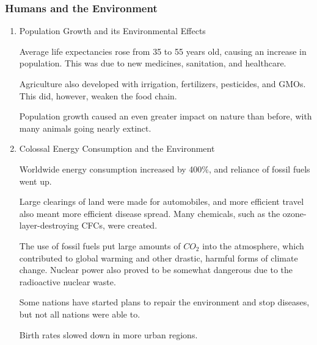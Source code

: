 \documentclass[11pt]{article}
\begin{document}
\subsubsection{Humans and the Environment}
\label{sec:org85379ab}
\begin{enumerate}
\item Population Growth and its Environmental Effects
\label{sec:org5441141}

Average life expectancies rose from 35 to 55 years old, causing an increase in population. This was due to new medicines, sanitation, and healthcare.

Agriculture also developed with irrigation, fertilizers, pesticides, and GMOs. This did, however, weaken the food chain.

Population growth caused an even greater impact on nature than before, with many animals going nearly extinct.

\item Colossal Energy Consumption and the Environment
\label{sec:org87a4da5}

Worldwide energy consumption increased by 400\%, and reliance of fossil fuels went up.

Large clearings of land were made for automobiles, and more efficient travel also meant more efficient disease spread. Many chemicals, such as the ozone-layer-destroying CFCs, were created.

The use of fossil fuels put large amounts of \(CO_2\) into the atmosphere, which contributed to global warming and other drastic, harmful forms of climate change. Nuclear power also proved to be somewhat dangerous due to the radioactive nuclear waste.

Some nations have started plans to repair the environment and stop diseases, but not all nations were able to.

Birth rates slowed down in more urban regions.
\end{enumerate}
\end{document}
